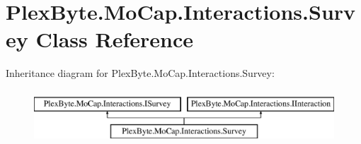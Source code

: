 \hypertarget{class_plex_byte_1_1_mo_cap_1_1_interactions_1_1_survey}{}\section{Plex\+Byte.\+Mo\+Cap.\+Interactions.\+Survey Class Reference}
\label{class_plex_byte_1_1_mo_cap_1_1_interactions_1_1_survey}
Inheritance diagram for Plex\+Byte.\+Mo\+Cap.\+Interactions.\+Survey\+:\begin{figure}[H]
\begin{center}
\leavevmode
\includegraphics[height=2.000000cm]{class_plex_byte_1_1_mo_cap_1_1_interactions_1_1_survey}
\end{center}
\end{figure}
